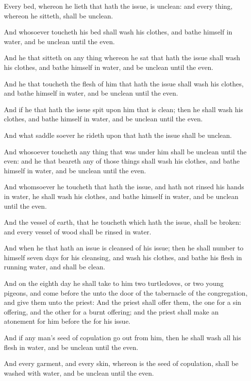 \Verse Every bed, whereon he lieth that hath the issue, is unclean: and every thing, whereon he sitteth, shall be unclean.

\Verse And whosoever toucheth his bed shall wash his clothes, and bathe himself in water, and be unclean until the even.

\Verse And he that sitteth on any thing whereon he sat that hath the issue shall wash his clothes, and bathe himself in water, and be unclean until the even.

\Verse And he that toucheth the flesh of him that hath the issue shall wash his clothes, and bathe himself in water, and be unclean until the even.

\Verse And if he that hath the issue spit upon him that is clean; then he shall wash his clothes, and bathe himself in water, and be unclean until the even.

\Verse And what saddle soever he rideth upon that hath the issue shall be unclean.

\Verse And whosoever toucheth any thing that was under him shall be unclean until the even: and he that beareth any of those things shall wash his clothes, and bathe himself in water, and be unclean until the even.

\Verse And whomsoever he toucheth that hath the issue, and hath not rinsed his hands in water, he shall wash his clothes, and bathe himself in water, and be unclean until the even.

\Verse And the vessel of earth, that he toucheth which hath the issue, shall be broken: and every vessel of wood shall be rinsed in water.

\Verse And when he that hath an issue is cleansed of his issue; then he shall number to himself seven days for his cleansing, and wash his clothes, and bathe his flesh in running water, and shall be clean.

\Verse And on the eighth day he shall take to him two turtledoves, or two young pigeons, and come before the \LORD unto the door of the tabernacle of the congregation, and give them unto the priest: \Verse And the priest shall offer them, the one for a sin offering, and the other for a burnt offering; and the priest shall make an atonement for him before the \LORD for his issue.

\Verse And if any man's seed of copulation go out from him, then he shall wash all his flesh in water, and be unclean until the even.

\Verse And every garment, and every skin, whereon is the seed of copulation, shall be washed with water, and be unclean until the even.

